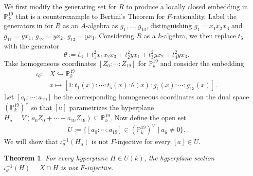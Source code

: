 \documentclass[reqno,11pt]{amsart}
\makeatletter
\numberwithin{equation}{section}
\newtheorem{theorem}{Theorem}[section]
\theoremstyle{definition}
\theoremstyle{definition}
\theoremstyle{definition}
\theoremstyle{remark}
\newcommand{\PP}{\mathbb{P}}
\renewcommand*{\eqref}[1]{%
  \hyperref[{#1}]{\textup{\tagform@{\ref*{#1}}}}%
}
\makeatother
\begin{document}
We first modify the generating set for $R$ to produce a locally closed embedding in $\PP^{19}_k$ that is a counterexample to Bertini's Theorem for $F$-rationality. Label the generators in \eqref{eq:A-algebra-gens} for $R$ as an $A$-algebra as $g_1,\ldots, g_{13}$, distinguishing $g_1=x_1x_2x_3$ and $g_{11}=yx_1$, $g_{12}=yx_2$, $g_{13}=yx_3$. Considering $R$ as a $k$-algebra, we then replace $t_6$ with the generator
\begin{equation}
    \theta:=t_6+t_1^2x_1x_2x_3+t_2^2 yx_1+t_3^2 yx_2+t_4^2 yx_3.
\end{equation}
Take homogeneous coordinates $[Z_0:\cdots :Z_{19}]$ for $\PP^{19}_k$ and consider the embedding
\begin{align*}
    \iota_\theta:&X\hookrightarrow \PP^{19}_k\\
    &x\mapsto [1:t_1(x):\cdots:t_5(x):\theta(x):g_1(x):\cdots:g_{13}(x)].
\end{align*}
Let $[a_0:\cdots:a_{19}]$ be the corresponding homogeneous coordinates on the dual space $(\PP^{19}_k)^\vee$ so that $[a]$ parametrizes the hyperplane $H_a=V(a_0Z_0+\cdots+a_{19}Z_{19})\subseteq \PP^{19}_k$. Now define the open set
\begin{align*}
    U:=\{[a_0:\cdots:a_{19}]\in (\PP^{19}_k)^\vee \mid a_6\neq 0\}.
\end{align*}
We will show that $\iota_\theta^{-1}(H_a)$ is not $F$-injective for every $[a]\in U$. 
\begin{theorem}
    For every hyperplane $H\in U(k)$, the hyperplane section $\iota_\theta^{-1}(H)=X\cap H$ is not $F$-injective.
\end{theorem}
\end{document}
